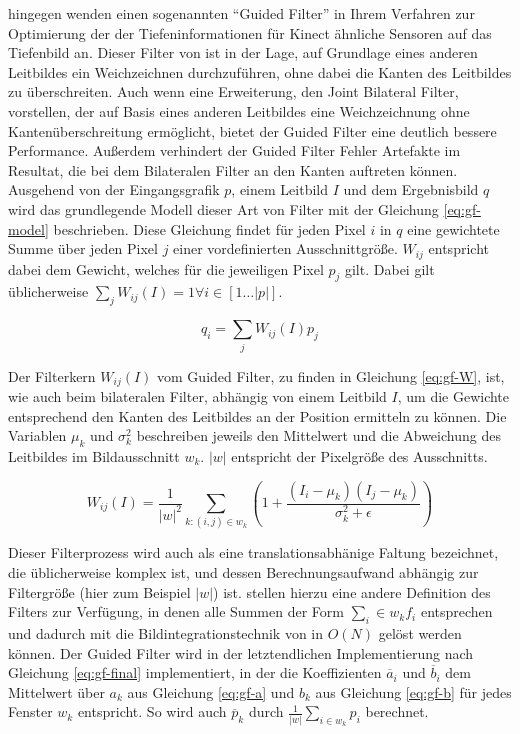 \citet{liu2012guided} hingegen wenden einen sogenannten \enquote{Guided Filter} in Ihrem Verfahren zur Optimierung der der Tiefeninformationen für Kinect ähnliche Sensoren auf das Tiefenbild an. Dieser Filter von \citet{he2010guided} ist in der Lage, auf Grundlage eines anderen Leitbildes ein Weichzeichnen durchzuführen, ohne dabei die Kanten des Leitbildes zu überschreiten. Auch wenn \citet{petschnigg2004digital} eine Erweiterung, den Joint Bilateral Filter, vorstellen, der auf Basis eines anderen Leitbildes eine Weichzeichnung ohne Kantenüberschreitung ermöglicht, bietet der Guided Filter eine deutlich bessere Performance. Außerdem verhindert der Guided Filter Fehler Artefakte im Resultat, die bei dem Bilateralen Filter an den Kanten auftreten können. \citep{he2010guided} \\


Ausgehend von der Eingangsgrafik \(p\), einem Leitbild \(I\) und dem Ergebnisbild \(q\) wird das grundlegende Modell dieser Art von Filter mit der Gleichung \ref{eq:gf-model} beschrieben. Diese Gleichung findet für jeden Pixel \(i\) in \(q\) eine gewichtete Summe über jeden Pixel \(j\) einer vordefinierten Ausschnittgröße. \(W_{ij}\) entspricht dabei dem Gewicht, welches für die jeweiligen Pixel \(p_j\) gilt. Dabei gilt üblicherweise  \(\sum_{j} W_{ij}(I)=1 \forall i \in [1\ldots |p|]\). \citep{he2010guided}

\begin{equation} \label{eq:gf-model}
q_{i} = \sum_j W_{ij}(I)p_j
\end{equation}

Der Filterkern \(W_{ij}(I)\) vom Guided Filter, zu finden in Gleichung \ref{eq:gf-W}, ist, wie auch beim bilateralen Filter, abhängig von einem Leitbild \(I\), um die Gewichte entsprechend den Kanten des Leitbildes an der Position ermitteln zu können. Die Variablen \(\mu_k\) und \(\sigma^2_k\) beschreiben jeweils den Mittelwert und die Abweichung des Leitbildes im Bildausschnitt \(w_k\). \(|w|\) entspricht der Pixelgröße des Ausschnitts. \citep{he2010guided}

\begin{equation} \label{eq:gf-W}
W_{ij}(I) = \frac{1}{|w|^2} \sum_{k:(i,j) \in w_k} (1+\frac{(I_i-\mu_k)(I_j-\mu_k)}{\sigma^2_k + \epsilon})
\end{equation}

Dieser Filterprozess wird auch als eine translationsabhänige Faltung bezeichnet, die üblicherweise komplex ist, und dessen Berechnungsaufwand abhängig zur Filtergröße (hier zum Beispiel \(|w|\)) ist. \citet{he2010guided} stellen hierzu eine andere Definition des Filters zur Verfügung, in denen alle Summen der Form \(\sum_i\in w_k f_i\) entsprechen und dadurch mit die Bildintegrationstechnik von \citet{crow1984summed} in \(O(N)\) gelöst werden können. Der Guided Filter wird in der letztendlichen Implementierung nach Gleichung \ref{eq:gf-final} implementiert, in der die Koeffizienten \(\overline{a}_i\) und \(\overline{b}_i\) dem Mittelwert über \(a_k\) aus Gleichung \ref{eq:gf-a} und \(b_k\) aus Gleichung \ref{eq:gf-b} für jedes Fenster \(w_k\) entspricht. So wird auch \(\overline{p}_k\) durch \(\frac{1}{|w|} \sum_{i \in w_k} p_i\) berechnet.



